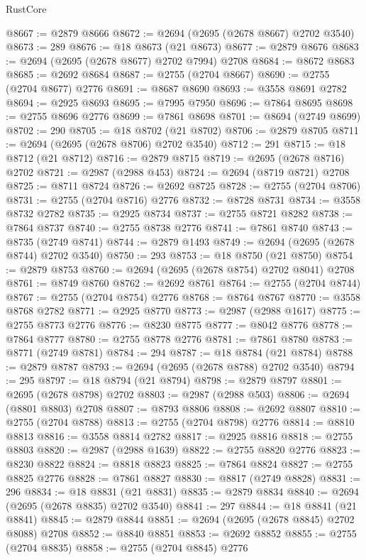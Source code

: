 \begin{lexlean}{RustCore}
\begin{coremodule}
@8667 := @2879 @8666
@8672 := @2694 (@2695 (@2678 @8667) @2702 @3540)
@8673 := 289
@8676 := @18 @8673 (@21 @8673)
@8677 := @2879 @8676
@8683 := @2694 (@2695 (@2678 @8677) @2702 @7994) @2708
@8684 := @8672 @8683
@8685 := @2692 @8684
@8687 := @2755 (@2704 @8667)
@8690 := @2755 (@2704 @8677) @2776
@8691 := @8687 @8690
@8693 := @3558 @8691 @2782
@8694 := @2925 @8693
@8695 := @7995 @7950
@8696 := @7864 @8695
@8698 := @2755 @8696 @2776
@8699 := @7861 @8698
@8701 := @8694 (@2749 @8699)
@8702 := 290
@8705 := @18 @8702 (@21 @8702)
@8706 := @2879 @8705
@8711 := @2694 (@2695 (@2678 @8706) @2702 @3540)
@8712 := 291
@8715 := @18 @8712 (@21 @8712)
@8716 := @2879 @8715
@8719 := @2695 (@2678 @8716) @2702
@8721 := @2987 (@2988 @453)
@8724 := @2694 (@8719 @8721) @2708
@8725 := @8711 @8724
@8726 := @2692 @8725
@8728 := @2755 (@2704 @8706)
@8731 := @2755 (@2704 @8716) @2776
@8732 := @8728 @8731
@8734 := @3558 @8732 @2782
@8735 := @2925 @8734
@8737 := @2755 @8721 @8282
@8738 := @7864 @8737
@8740 := @2755 @8738 @2776
@8741 := @7861 @8740
@8743 := @8735 (@2749 @8741)
@8744 := @2879 @1493
@8749 := @2694 (@2695 (@2678 @8744) @2702 @3540)
@8750 := 293
@8753 := @18 @8750 (@21 @8750)
@8754 := @2879 @8753
@8760 := @2694 (@2695 (@2678 @8754) @2702 @8041) @2708
@8761 := @8749 @8760
@8762 := @2692 @8761
@8764 := @2755 (@2704 @8744)
@8767 := @2755 (@2704 @8754) @2776
@8768 := @8764 @8767
@8770 := @3558 @8768 @2782
@8771 := @2925 @8770
@8773 := @2987 (@2988 @1617)
@8775 := @2755 @8773 @2776
@8776 := @8230 @8775
@8777 := @8042 @8776
@8778 := @7864 @8777
@8780 := @2755 @8778 @2776
@8781 := @7861 @8780
@8783 := @8771 (@2749 @8781)
@8784 := 294
@8787 := @18 @8784 (@21 @8784)
@8788 := @2879 @8787
@8793 := @2694 (@2695 (@2678 @8788) @2702 @3540)
@8794 := 295
@8797 := @18 @8794 (@21 @8794)
@8798 := @2879 @8797
@8801 := @2695 (@2678 @8798) @2702
@8803 := @2987 (@2988 @503)
@8806 := @2694 (@8801 @8803) @2708
@8807 := @8793 @8806
@8808 := @2692 @8807
@8810 := @2755 (@2704 @8788)
@8813 := @2755 (@2704 @8798) @2776
@8814 := @8810 @8813
@8816 := @3558 @8814 @2782
@8817 := @2925 @8816
@8818 := @2755 @8803
@8820 := @2987 (@2988 @1639)
@8822 := @2755 @8820 @2776
@8823 := @8230 @8822
@8824 := @8818 @8823
@8825 := @7864 @8824
@8827 := @2755 @8825 @2776
@8828 := @7861 @8827
@8830 := @8817 (@2749 @8828)
@8831 := 296
@8834 := @18 @8831 (@21 @8831)
@8835 := @2879 @8834
@8840 := @2694 (@2695 (@2678 @8835) @2702 @3540)
@8841 := 297
@8844 := @18 @8841 (@21 @8841)
@8845 := @2879 @8844
@8851 := @2694 (@2695 (@2678 @8845) @2702 @8088) @2708
@8852 := @8840 @8851
@8853 := @2692 @8852
@8855 := @2755 (@2704 @8835)
@8858 := @2755 (@2704 @8845) @2776

\end{coremodule}
\end{lexlean}
